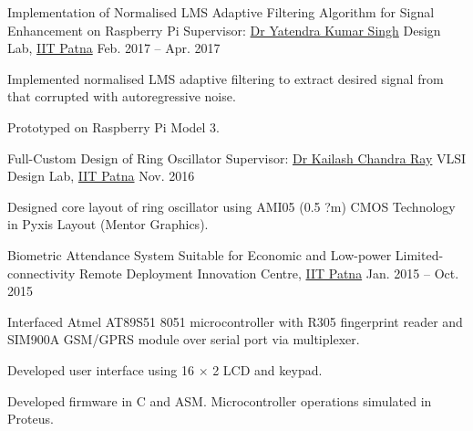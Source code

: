 
\begin{cvprojects}

\cvproject
	{Implementation of Normalised LMS Adaptive Filtering Algorithm for Signal Enhancement on Raspberry Pi} %
	{Supervisor: \href{https://www.iitp.ac.in/index.php/departments/engineering/electrical-engineering/people/faculty/dr-yatendra-kumar-singh.html}{Dr Yatendra Kumar Singh}} %
	{Design Lab, \href{https://www.iitp.ac.in}{IIT Patna}} %
	{Feb. 2017 -- Apr. 2017} %
	{\begin{cvitems} %
		\item {Implemented normalised LMS adaptive filtering to extract desired signal from that corrupted with autoregressive noise.}
		\item {Prototyped on Raspberry Pi Model 3.}
	\end{cvitems}}

\cvproject
	{Full-Custom Design of Ring Oscillator} %
	{Supervisor: \href{https://www.iitp.ac.in/index.php/departments/engineering/electrical-engineering/people/faculty/dr-kailash-chandra-ray.html}{Dr Kailash Chandra Ray}} %
	{VLSI Design Lab, \href{https://www.iitp.ac.in}{IIT Patna}} %
	{Nov. 2016} %
	{\begin{cvitems} %
		\item {Designed core layout of ring oscillator using AMI05 (0.5 ?m) CMOS Technology in Pyxis Layout (Mentor Graphics).}
	\end{cvitems}}

\cvproject
	{Biometric Attendance System Suitable for Economic and Low-power Limited-connectivity Remote Deployment} %
	{} %
	{Innovation Centre, \href{https://www.iitp.ac.in}{IIT Patna}} %
	{Jan. 2015 -- Oct. 2015} %
	{\begin{cvitems} %
		\item {Interfaced Atmel AT89S51 8051 microcontroller with R305 fingerprint reader and SIM900A GSM/GPRS module over serial port via multiplexer.}
		\item {Developed user interface using 16 $\times$ 2 LCD and keypad.}
		\item {Developed firmware in C and ASM. Microcontroller operations simulated in Proteus.}
	\end{cvitems}}

\end{cvprojects}
